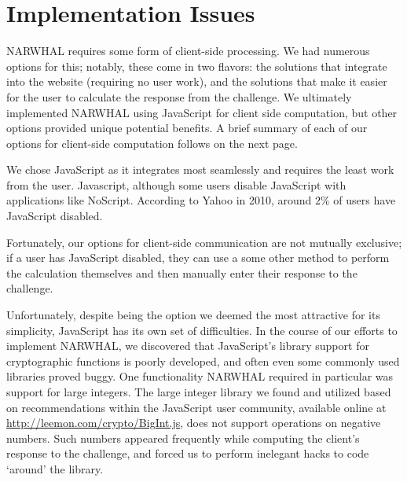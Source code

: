 \documentclass[11pt]{article}
\begin{document}
\section{Implementation Issues}
NARWHAL requires some form of client-side processing. We had numerous options for this; notably, these come in two flavors: the solutions that integrate into the website (requiring no user work), and the solutions that make it easier for the user to calculate the response from the challenge. We ultimately implemented NARWHAL using JavaScript for client side computation, but other options provided unique potential benefits. A brief summary of each of our options for client-side computation follows on the next page.

We chose JavaScript as it integrates most seamlessly and requires the least work from the user. Javascript, although some users disable JavaScript with applications like NoScript. According to Yahoo in 2010, around $2\%$ of users have JavaScript disabled. \cite{Zakas}

Fortunately, our options for client-side communication are not mutually exclusive; if a user has JavaScript disabled, they can use a some other method to perform the calculation themselves and then manually enter their response to the challenge.

Unfortunately, despite being the option we deemed the most attractive for its simplicity, JavaScript has its own set of difficulties.  In the course of our efforts to implement NARWHAL, we discovered that JavaScript's library support for cryptographic functions is poorly developed, and often even some commonly used libraries proved buggy.  One functionality NARWHAL required in particular was support for large integers.  The large integer library we found and utilized based on recommendations within the JavaScript user community, available online at \url{http://leemon.com/crypto/BigInt.js}, does not support operations on negative numbers.  Such numbers appeared frequently while computing the client's response to the challenge, and forced us to perform inelegant hacks to code ‘around' the library.
\end{document}

